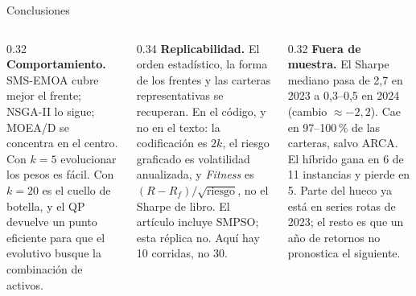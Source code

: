 \documentclass[final]{beamer}
\begin{document}
\begin{frame}[t]
\vspace{1.4mm}
\begin{block}{Conclusiones}
\begin{columns}[t,onlytextwidth]
\begin{column}{0.32\textwidth}
\textbf{Comportamiento.}
SMS-EMOA cubre mejor el frente; NSGA-II lo sigue; MOEA/D se concentra en el centro. Con \(k=5\) evolucionar los pesos es fácil. Con \(k=20\) es el cuello de botella, y el QP devuelve un punto eficiente para que el evolutivo busque la combinación de activos.
\end{column}
\begin{column}{0.34\textwidth}
\textbf{Replicabilidad.}
El orden estadístico, la forma de los frentes y las carteras representativas se recuperan. En el código, y no en el texto: la codificación es \(2k\), el riesgo graficado es volatilidad anualizada, y \textit{Fitness} es \((R-R_{f})/\sqrt{\text{riesgo}}\), no el Sharpe de libro. El artículo incluye SMPSO; esta réplica no. Aquí hay 10 corridas, no 30.
\end{column}
\begin{column}{0.32\textwidth}
\textbf{Fuera de muestra.}
El Sharpe mediano pasa de 2{,}7 en 2023 a 0{,}3--0{,}5 en 2024 (cambio \(\approx -2{,}2\)). Cae en 97--100\,\% de las carteras, salvo ARCA. El híbrido gana en 6 de 11 instancias y pierde en 5. Parte del hueco ya está en series rotas de 2023; el resto es que un año de retornos no pronostica el siguiente.
\end{column}
\end{columns}
\end{block}

\end{frame}
\end{document}
